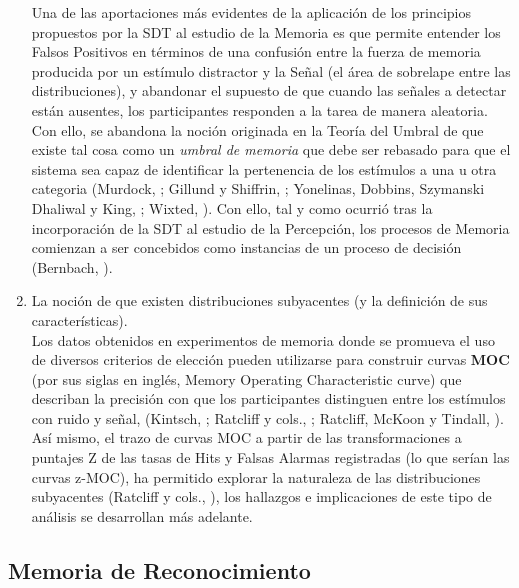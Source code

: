 \begin{enumerate}
Una de las aportaciones más evidentes de la aplicación de los principios propuestos por la SDT al estudio de la Memoria es que permite entender los Falsos Positivos en términos de una confusión entre la fuerza de memoria producida por un estímulo distractor y la Señal (el área de sobrelape entre las distribuciones), y abandonar el supuesto de que cuando las señales a detectar están ausentes, los participantes responden a la tarea de manera aleatoria. Con ello, se abandona la noción originada en la Teoría del Umbral de que existe tal cosa como un \textit{umbral de memoria} que debe ser rebasado para que el sistema sea capaz de identificar la pertenencia de los estímulos a una u otra categoria (Murdock, \citeyear{Murdock1982}; Gillund y Shiffrin, \citeyear{Gillund1984}; Yonelinas, Dobbins, Szymanski Dhaliwal y King, \citeyear{Yonelinas1996}; Wixted, \citeyear{Wixted2007}). Con ello, tal y como ocurrió tras la incorporación de la SDT al estudio de la Percepción, los procesos de Memoria comienzan a ser concebidos como instancias de un proceso de decisión (Bernbach, \citeyear{Bernbach1967}).\\
 
\item La noción de que existen distribuciones subyacentes (y la definición de sus características).\\

Los datos obtenidos en experimentos de memoria donde se promueva el uso de diversos criterios de elección pueden utilizarse para construir curvas \textbf{MOC} (por sus siglas en inglés, Memory Operating Characteristic curve) que describan la precisión con que los participantes distinguen entre los estímulos con ruido y señal, (Kintsch, \citeyear{Kintsch1967}; Ratcliff y cols., \citeyear{Ratcliff1992}; Ratcliff, McKoon y Tindall, \citeyear{Ratcliff1994}). Así mismo, el trazo de curvas MOC a partir de las transformaciones a puntajes Z de las tasas de Hits y Falsas Alarmas registradas (lo que serían las curvas z-MOC), ha permitido explorar la naturaleza de las distribuciones subyacentes (Ratcliff y cols., \citeyear{Ratcliff1992}), los hallazgos e implicaciones de este tipo de análisis se desarrollan más adelante.\\
\end{enumerate} 

\subsection{ Memoria de Reconocimiento}

